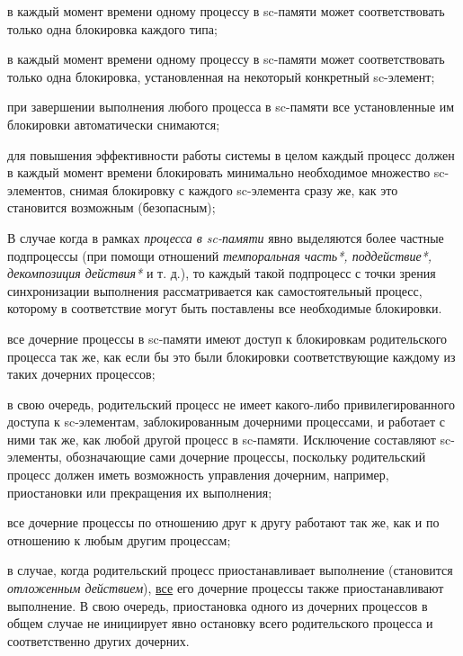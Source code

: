 \begin{textitemize}
	\item в каждый момент времени одному процессу в sc-памяти может соответствовать только одна блокировка каждого типа;
	\item в каждый момент времени одному процессу в sc-памяти может соответствовать только одна блокировка, установленная на некоторый конкретный sc-элемент;
	\item при завершении выполнения любого процесса в sc-памяти все установленные им блокировки автоматически снимаются;
	\item для повышения эффективности работы системы в целом каждый процесс должен в каждый момент времени блокировать минимально необходимое множество sc-элементов, снимая блокировку с каждого sc-элемента сразу же, как это становится возможным (безопасным);
	\item В случае когда в рамках \textit{процесса в sc-памяти} явно выделяются более частные подпроцессы (при помощи отношений \textit{темпоральная часть*, поддействие*, декомпозиция действия*} и т. д.), то каждый такой подпроцесс с точки зрения синхронизации выполнения рассматривается как самостоятельный процесс, которому в соответствие могут быть поставлены все необходимые блокировки.
	\begin{textitemize}
		\item все дочерние процессы в sc-памяти имеют доступ к блокировкам родительского процесса так же, как если бы это были блокировки соответствующие каждому из таких дочерних процессов;
		\item в свою очередь, родительский процесс не имеет какого-либо привилегированного доступа к sc-элементам, заблокированным дочерними процессами, и работает с ними так же, как любой другой процесс в sc-памяти. Исключение составляют sc-элементы, обозначающие сами дочерние процессы, поскольку родительский процесс должен иметь возможность управления дочерним, например, приостановки или прекращения их выполнения;
		\item все дочерние процессы по отношению друг к другу работают так же, как и по отношению к любым другим процессам;
		\item в случае, когда родительский процесс приостанавливает выполнение (становится \textit{отложенным действием}), \uline{все} его дочерние процессы также приостанавливают выполнение. В свою очередь, приостановка одного из дочерних процессов в общем случае не инициирует явно остановку всего родительского процесса и соответственно других дочерних.
		\end{textitemize}
\end{textitemize}

